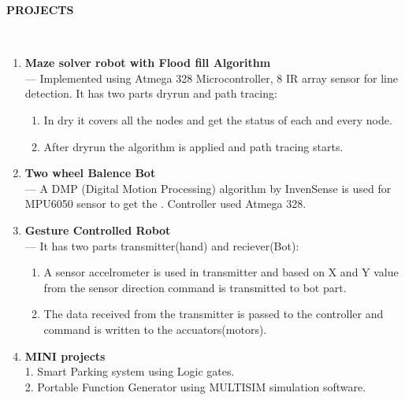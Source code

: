 \documentclass[a4paper,10pt]{article}
\newcommand{\lsep}{-0.5cm}
\newcommand{\resheading}[1]{{\small \colorbox{mygrey}{\begin{minipage}{0.975\textwidth}{\textbf{#1 \vphantom{p\^{E}}}}\end{minipage}}}}
\begin{document}
\resheading{\textbf{PROJECTS} }\\[\lsep]
\begin{enumerate}
\item \noindent \textbf{Maze solver robot with Flood fill Algorithm}\\
\indent --- Implemented using Atmega 328 Microcontroller, 8 IR array sensor for line detection. It has two parts dryrun and path tracing:
\begin{enumerate}
\item In dry it covers all the nodes and get the status of each and every node.
\item  After dryrun the algorithm is applied and path tracing starts.
\end{enumerate} 

\item\noindent\textbf{Two wheel Balence Bot}\\
\indent --- A DMP (Digital Motion Processing) algorithm by InvenSense is used for MPU6050 sensor to get the . Controller used Atmega 328.

\item\noindent\textbf{Gesture Controlled Robot}\\
\indent --- It has two parts transmitter(hand) and reciever(Bot):
\begin{enumerate}
\item  A sensor accelrometer is used in transmitter and based on X and Y value from the sensor direction command is transmitted to bot part.
\item The data received from the transmitter is passed to the controller and command is written to the accuators(motors).
\end{enumerate}
\item\noindent\textbf{MINI projects}\\
1. Smart Parking system using Logic gates.\\
2. Portable Function Generator using MULTISIM simulation software.
\end{enumerate}
\end{document}
